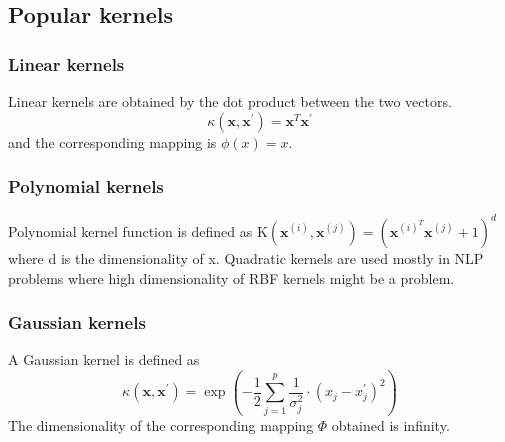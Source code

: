\documentclass[../main.tex]{subfiles}
\begin{document}
    \subsection{Popular kernels}
        \subsubsection{Linear kernels} Linear kernels are obtained by the dot product between the two vectors.
        $$
\kappa\left(\mathbf{x}, \mathbf{x}^{\prime}\right)=\mathbf{x}^{T} \mathbf{x}^{\prime}
$$
            and the corresponding mapping is $\phi(x)=x$.
        \subsubsection{Polynomial kernels} Polynomial kernel function is defined as 
        K$\left(\mathbf{x}^{(i)}, \mathbf{x}^{(j)}\right)=\left(\mathbf{x}^{(i)^{T}} \mathbf{x}^{(j)}+1\right)^{d}$ where d is the dimensionality of x.
        Quadratic kernels are used mostly in NLP problems where high dimensionality of RBF kernels might be a problem.
        
        \subsubsection{Gaussian kernels} A Gaussian kernel is defined as 
        $$\kappa\left(\mathbf{x}, \mathbf{x}^{\prime}\right)=\exp \left(-\frac{1}{2} \sum_{j=1}^{p} \frac{1}{\sigma_{j}^{2}} \cdot\left(x_{j}-x_{j}^{\prime}\right)^{2}\right)$$
        The dimensionality of the corresponding mapping $\Phi$ obtained is infinity.
        
    
\end{document}
